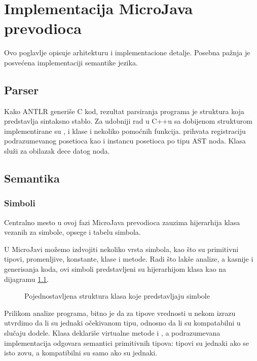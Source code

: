 \chapter{Implementacija MicroJava prevodioca}
\label{ch:implementacija}

Ovo poglavlje opisuje arhitekturu i implementacione detalje. Posebna pažnja je posvećena implementaciji semantike jezika.

\section{Parser}

Kako ANTLR generiše C kod, rezultat parsiranja programa je struktura koja predstavlja sintaksno stablo.
Za udobniji rad  u C++u sa dobijenom strukturom implementirane su
,  i  klase i nekoliko pomoćnih funkcija.  prihvata registraciju podrazumevanog posetioca kao i instancu posetioca po tipu AST noda.
Klasa  služi za obilazak dece datog noda.

\section{Semantika}

\subsection*{Simboli}

Centralno mesto u ovoj fazi MicroJava prevodioca zauzima hijerarhija klasa vezanih za simbole, opsege i tabelu simbola.

U MicroJavi možemo izdvojiti nekoliko vrsta simbola, kao što su primitivni tipovi, promenljive, konstante, klase i metode.
Radi što lakše analize, a kasnije i generisanja koda, ovi simboli predstavljeni su hijerarhijom klasa kao na dijagramu \ref{fig:symbols}.

\begin{figure}[h]

	\centering
	
	\caption{Pojednostavljena struktura klasa koje predstavljaju simbole}
	\label{fig:symbols}
\end{figure}

Prilikom analize programa, bitno je da za tipove vrednosti u nekom izrazu utvrdimo da li su jednaki očekivanom tipu, odnosno da li su kompatabilni u slučaju dodele.
Klasa  deklariše virtualne metode  i , a podrazumevana implementacija odgovara semantici primitivnih tipova: tipovi su jednaki ako se isto zovu, a kompatibilni su samo ako su jednaki.

